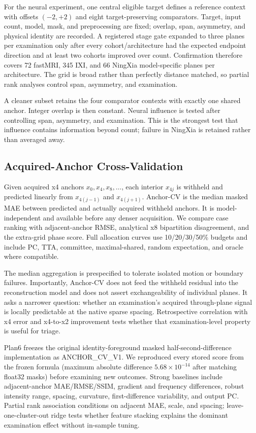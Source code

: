 \documentclass[10pt,twocolumn,letterpaper]{article}
\begin{document}
For the neural experiment, one central eligible target defines a reference context with offsets $(-2,+2)$ and eight target-preserving comparators. Target, input count, model, mask, and preprocessing are fixed; overlap, span, asymmetry, and physical identity are recorded. A registered stage gate expanded to three planes per examination only after every cohort/architecture had the expected endpoint direction and at least two cohorts improved over count. Confirmation therefore covers 72 fastMRI, 345 IXI, and 66 NingXia model-specific planes per architecture. The grid is broad rather than perfectly distance matched, so partial rank analyses control span, asymmetry, and examination.

A cleaner subset retains the four comparator contexts with exactly one shared anchor. Integer overlap is then constant. Neural influence is tested after controlling span, asymmetry, and examination. This is the strongest test that influence contains information beyond count; failure in NingXia is retained rather than averaged away.

\subsection{Acquired-Anchor Cross-Validation}
Given acquired x4 anchors $x_0,x_4,x_8,\ldots$, each interior $x_{4j}$ is withheld and predicted linearly from $x_{4(j-1)}$ and $x_{4(j+1)}$. Anchor-CV is the median masked MAE between predicted and actually acquired withheld anchors. It is model-independent and available before any denser acquisition. We compare case ranking with adjacent-anchor RMSE, analytical x8 bipartition disagreement, and the extra-grid phase score. Full allocation curves use 10/20/30/50\% budgets and include PC, TTA, committee, maximal-shared, random expectation, and oracle where compatible.

The median aggregation is prespecified to tolerate isolated motion or boundary failures. Importantly, Anchor-CV does not feed the withheld residual into the reconstruction model and does not assert exchangeability of individual planes. It asks a narrower question: whether an examination's acquired through-plane signal is locally predictable at the native sparse spacing. Retrospective correlation with x4 error and x4-to-x2 improvement tests whether that examination-level property is useful for triage.

Plan6 freezes the original identity-foreground masked half-second-difference implementation as ANCHOR\_CV\_V1. We reproduced every stored score from the frozen formula (maximum absolute difference $5.68\times10^{-14}$ after matching float32 masks) before examining new outcomes. Strong baselines include adjacent-anchor MAE/RMSE/SSIM, gradient and frequency differences, robust intensity range, spacing, curvature, first-difference variability, and output PC. Partial rank association conditions on adjacent MAE, scale, and spacing; leave-one-cluster-out ridge tests whether feature stacking explains the dominant examination effect without in-sample tuning.
\end{document}
